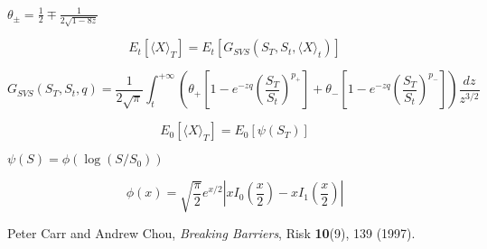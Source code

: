 \documentclass[12pt]{article}
\begin{document}
  $\theta_{\pm}=\frac{1}{2}\mp\frac{1}{2\sqrt{1-8z}}$

  \begin{equation}
    E_t\left[\langle X \rangle_T\right] = E_t\left[G_{SVS}\left(S_T,S_t,\langle X \rangle_t\right)\right]
  \end{equation}

  \begin{equation}
    G_{SVS}\left(S_T,S_t,q\right) = \frac{1}{2\sqrt{\pi}}\int_t^{+\infty}\left(\theta_+\left[1-e^{-zq}\left(\frac{S_T}{S_t}\right)^{p_+}\right]
                                                                            + \theta_-\left[1-e^{-zq}\left(\frac{S_T}{S_t}\right)^{p_-}\right]\right)\frac{dz}{z^{3/2}}
  \end{equation}

  \begin{equation}
    E_0\left[\langle X \rangle_T\right] = E_0\left[\psi(S_T)\right]
  \end{equation}

  $\psi(S)=\phi(\log(S/S_0))$

  \begin{equation}
    \phi(x)=\sqrt{\frac{\pi}{2}}e^{x/2}\left|xI_0\left(\frac{x}{2}\right)-xI_1\left(\frac{x}{2}\right)\right|
  \end{equation}


\begin{thebibliography}{99}
    Peter Carr and Andrew Chou, {\it Breaking Barriers}, Risk {\bf 10}(9), 139 (1997).

\end{thebibliography}
\end{document}

